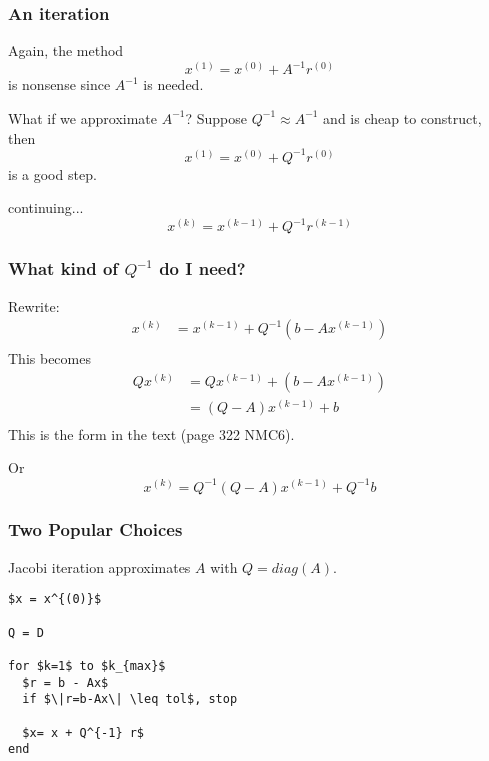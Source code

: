 \documentclass[10pt]{beamer}
\begin{document}
\begin{frame}
\frametitle{An iteration}
Again, the method
\begin{equation*}
	x^{(1)} = x^{(0)} + A^{-1} r^{(0)}
\end{equation*}
is nonsense since $A^{-1}$ is needed.
\bigskip

What if we approximate $A^{-1}$?  Suppose $Q^{-1} \approx A^{-1}$ and is cheap to construct, then
\begin{equation*}
	x^{(1)} = x^{(0)} + Q^{-1} r^{(0)}
\end{equation*}
is a good step.
\bigskip

continuing...
\begin{equation*}
	x^{(k)} = x^{(k-1)} + Q^{-1} r^{(k-1)}
\end{equation*}
\end{frame}
\begin{frame}
\frametitle{What kind of $Q^{-1}$ do I need?}
Rewrite:
\begin{align*}
	x^{(k)} &= x^{(k-1)} + Q^{-1} (b-Ax^{(k-1)})\\
\end{align*}
This becomes
\begin{align*}
	Q x^{(k)} &= Q x^{(k-1)} + (b-Ax^{(k-1)})\\
	                &= (Q-A) x^{(k-1)} + b\\
\end{align*}
This is the form in the text (page 322 NMC6).
\bigskip

Or
\begin{equation*}
x^{(k)} = Q^{-1}(Q-A) x^{(k-1)} + Q^{-1}b
\end{equation*}

\end{frame}
\begin{frame}[fragile]
\frametitle{Two Popular Choices}
\begin{example}
Jacobi iteration approximates $A$ with $Q=diag(A)$.
\bigskip

\begin{lstlisting}[mathescape]
$x = x^{(0)}$

Q = D

for $k=1$ to $k_{max}$
  $r = b - Ax$
  if $\|r=b-Ax\| \leq tol$, stop

  $x= x + Q^{-1} r$
end
\end{lstlisting}
\end{example}
\end{frame}
\end{document}
